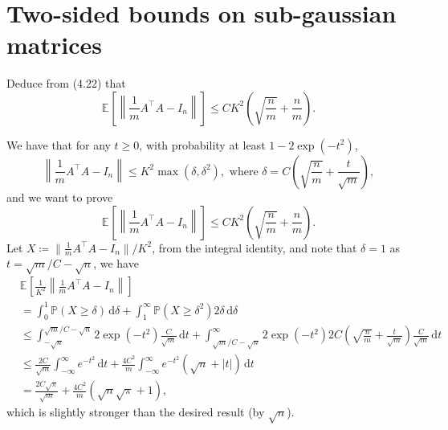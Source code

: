\section{Two-sided bounds on sub-gaussian matrices}
\begin{problem*}[Exercise 4.6.2]\label{ex4.6.2}
	Deduce from (4.22) that
	\[
		\mathbb{E}_{}\left[\left\lVert \frac{1}{m}A ^{\top} A - I_n \right\rVert \right]
		\leq CK^2 \left( \sqrt{\frac{n}{m}} + \frac{n}{m} \right) .
	\]
\end{problem*}
\begin{answer}
	We have that for any \(t \geq 0\), with probability at least \(1 - 2 \exp (- t^2)\),
	\[
		\left\lVert \frac{1}{m}A^{\top} A - I_n \right\rVert
		\leq K^2 \max (\delta , \delta ^2), \text{ where }
		\delta = C \left( \sqrt{\frac{n}{m}} + \frac{t}{\sqrt{m} } \right),
	\]
	and we want to prove
	\[
		\mathbb{E}_{}\left[\left\lVert \frac{1}{m}A^{\top} A - I_n \right\rVert \right]
		\leq C K^2 \left( \sqrt{\frac{n}{m}} + \frac{n}{m} \right) .
	\]
	Let \(X \coloneqq \lVert \frac{1}{m}A^{\top} A - I_n \rVert / K^2\), from the integral identity, and note that \(\delta = 1\) as \(t = \sqrt{m} / C - \sqrt{n} \), we have
	\[
		\begin{split}
			 & \mathbb{E}_{}\left[\frac{1}{K^2} \left\lVert \frac{1}{m}A^{\top} A - I_n \right\rVert \right]                                                                                                                                                              \\
			 & = \int_{0}^{1} \mathbb{P} (X \geq \delta ) \,\mathrm{d}\delta + \int_{1}^{\infty} \mathbb{P} (X \geq \delta ^2) 2 \delta \,\mathrm{d}\delta                                                                                                                \\
			 & \leq \int_{-\sqrt{n} }^{\sqrt{m} / C - \sqrt{n} } 2 \exp (- t^2) \frac{C}{\sqrt{m} } \,\mathrm{d}t + \int_{\sqrt{m} / C - \sqrt{n} }^{\infty} 2 \exp (- t^2) 2 C \left( \sqrt{\frac{n}{m}} + \frac{t}{\sqrt{m} } \right) \frac{C}{\sqrt{m} } \,\mathrm{d}t \\
			 & \leq \frac{2C}{\sqrt{m} } \int_{-\infty}^{\infty} e^{-t^2} \,\mathrm{d}t + \frac{4C^2}{m} \int_{-\infty}^{\infty} e^{-t^2} (\sqrt{n} + \lvert t \rvert ) \,\mathrm{d}t                                                                                     \\
			 & = \frac{2C \sqrt{\pi } }{\sqrt{m} }+ \frac{4C^2}{m} \left( \sqrt{n} \sqrt{\pi } + 1 \right),
		\end{split}
	\]
	which is slightly stronger than the desired result (by \(\sqrt{n} \)).
\end{answer}

